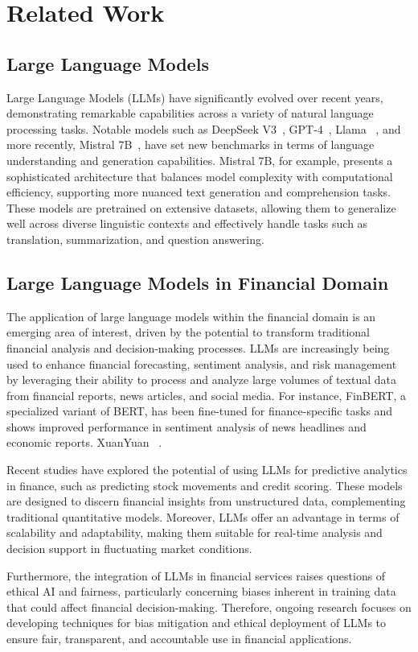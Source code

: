 \section{Related Work}
\subsection{Large Language Models}
Large Language Models (LLMs) have significantly evolved over recent years, demonstrating remarkable capabilities across a variety of natural language processing tasks. Notable models such as DeepSeek V3~\cite{liu2024deepseek}, GPT-4~\cite{achiam2023gpt}, Llama ~\cite{touvron2023llama}, and more recently, Mistral 7B~\cite{jiang2023mistral}, have set new benchmarks in terms of language understanding and generation capabilities. Mistral 7B, for example, presents a sophisticated architecture that balances model complexity with computational efficiency, supporting more nuanced text generation and comprehension tasks. These models are pretrained on extensive datasets, allowing them to generalize well across diverse linguistic contexts and effectively handle tasks such as translation, summarization, and question answering.

\subsection{Large Language Models in Financial Domain}
The application of large language models within the financial domain is an emerging area of interest, driven by the potential to transform traditional financial analysis and decision-making processes. LLMs are increasingly being used to enhance financial forecasting, sentiment analysis, and risk management by leveraging their ability to process and analyze large volumes of textual data from financial reports, news articles, and social media. For instance, FinBERT, a specialized variant of BERT, has been fine-tuned for finance-specific tasks and shows improved performance in sentiment analysis of news headlines and economic reports. XuanYuan ~\cite{zhang2023xuanyuan}.

Recent studies have explored the potential of using LLMs for predictive analytics in finance, such as predicting stock movements and credit scoring. These models are designed to discern financial insights from unstructured data, complementing traditional quantitative models. Moreover, LLMs offer an advantage in terms of scalability and adaptability, making them suitable for real-time analysis and decision support in fluctuating market conditions.

Furthermore, the integration of LLMs in financial services raises questions of ethical AI and fairness, particularly concerning biases inherent in training data that could affect financial decision-making. Therefore, ongoing research focuses on developing techniques for bias mitigation and ethical deployment of LLMs to ensure fair, transparent, and accountable use in financial applications.